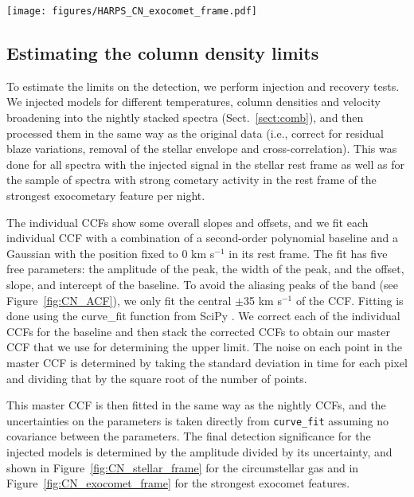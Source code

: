 \documentclass{aa}
\newcommand{\kms}{km s$^{-1}$}
\begin{document}
\begin{figure*}
    \begin{centering}
        \texttt{[image: figures/HARPS\_CN\_exocomet\_frame.pdf]}
        \caption{ measurement limits in the exocomet frame for a  line width of 2.7, 10 and 20 \kms{}. Contours show signal to noise upper limits.}
        \label{fig:CN_exocomet_frame}
    \end{centering}
\end{figure*}

\subsection{Estimating the \texorpdfstring{}{CN} column density limits}\label{sect:CNlim}

To estimate the limits on the  detection, we perform injection and recovery tests.
%
We injected models for different temperatures, column densities and velocity broadening into the nightly stacked spectra (Sect.~\ref{sect:comb}), and then processed them in the same way as the original data (i.e., correct for residual blaze variations, removal of the stellar envelope and cross-correlation).
%
This was done for all spectra with the injected signal in the stellar rest frame as well as for the sample of spectra with strong cometary activity in the rest frame of the strongest exocometary feature per night.

The individual CCFs show some overall slopes and offsets, and we fit each individual CCF with a combination of a second-order polynomial baseline and a Gaussian with the position fixed to 0 \kms{} in its rest frame.
%
The fit has five free parameters: the amplitude of the peak, the width of the peak, and the offset, slope, and intercept of the baseline.
%
To avoid the aliasing peaks of the  band (see Figure~\ref{fig:CN_ACF}), we only fit the central $\pm$35 \kms{} of the CCF.
%
Fitting is done using the curve\_fit function from SciPy \citep{2020SciPy-NMeth}.
%
We correct each of the individual CCFs for the baseline and then stack the corrected CCFs to obtain our master CCF that we use for determining the upper limit.
%
The noise on each point in the master CCF is determined by taking the standard deviation in time for each pixel and dividing that by the square root of the number of points.

This master CCF is then fitted in the same way as the nightly CCFs, and the uncertainties on the parameters is taken directly from {\tt curve\_fit} assuming no covariance between the parameters.
%
The final detection significance for the injected models is determined by the amplitude divided by its uncertainty, and shown in Figure~\ref{fig:CN_stellar_frame} for the circumstellar gas and in Figure~\ref{fig:CN_exocomet_frame} for the strongest exocomet features.
\end{document}
